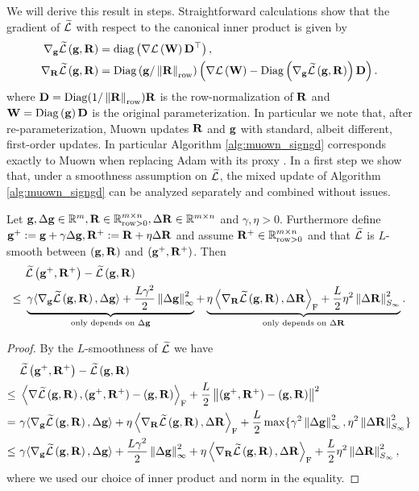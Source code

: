 {We will derive this result in steps. Straightforward calculations show that the gradient of $\Ft$ with respect to the canonical inner product is given by
\begin{align*}
    \nabla_\g \Ft\pare{\g, \Rbf} &= \mathrm{diag}\pare{\nabla \mathcal L\pare{\W} \D^\top},\\
    \nabla_\Rbf \Ft\pare{\g, \Rbf} &= \Diag\pare{\g/\RowNorm{\Rbf}}\pare{\nabla \mathcal L\pare{\W} - \Diag\pare{\nabla_\g \Ft\pare{\g,\Rbf}} \D}.
\end{align*}
where $\D = \Diag(1/\RowNorm{\Rbf})\Rbf$ is the row-normalization of $\Rbf$ and $\W = \Diag\pare{\g} \D$ is the original parameterization. In particular we note that, after re-parameterization, Muown updates $\Rbf$ and $\g$ with standard, albeit different, first-order updates. In particular Algorithm \ref{alg:muown_signgd} corresponds exactly to Muown when replacing Adam with its proxy \signsgd. In a first step we show that, under a smoothness assumption on $\Ft$, the mixed update of Algorithm \ref{alg:muown_signgd} can be analyzed separately and combined without issues.

\begin{lemma}\label{lem:split_algs}
    Let $\g, \Delta \g \in \mathbb{R}^m, \Rbf\in \rowPos, \Delta \Rbf \in \mathbb{R}^{m \times n}$ and $\gamma, \eta > 0$. Furthermore define $\g^+ := \g + \gamma \Delta \g, \Rbf^+ := \Rbf + \eta \Delta \Rbf$ and assume $\Rbf^+ \in \rowPos$ and that $\Ft$ is $L$-smooth between $(\g, \Rbf)$ and $(\g^+, \Rbf^+)$. Then
    \begin{align*}
        &\ \Ft\pare{\g^+, \Rbf^+} - \Ft\pare{\g, \Rbf} \\
        \leq &\  
        \underbrace{\gamma \langle \nabla_\g \Ft\pare{\g,\Rbf}, \Delta \g\rangle + \frac{L \gamma^2}{2}\norm{\Delta \g}_\infty^2}_{\text{only depends on $\Delta \g$}}
        + \underbrace{\eta \innerF{\nabla_\Rbf \Ft\pare{\g,\Rbf}}{\Delta \Rbf} + \frac{L}{2} \eta^2\opnorm{\Delta \Rbf}^2}_{\text{only depends on $\Delta \Rbf$}}.
    \end{align*}
\end{lemma}
\begin{proof}
    By the $L$-smoothness of $\Ft$ we have
    \begin{align*}
        &\ \Ft\pare{\g^+, \Rbf^+} - \Ft\pare{\g, \Rbf} \\
        \leq &\ \innerF{\nabla \Ft\pare{\g, \Rbf}}{(\g^+, \Rbf^+) - (\g, \Rbf)} + \frac{L}{2}\norm{(\g^+, \Rbf^+) - (\g, \Rbf)}^2 \\
        = &\ \gamma \langle \nabla_\g \Ft\pare{\g,\Rbf}, \Delta \g\rangle + \eta \innerF{\nabla_\Rbf \Ft\pare{\g,\Rbf}}{\Delta \Rbf} + \frac{L}{2}\max\{\gamma^2\norm{\Delta \g}_\infty^2, \eta^2\opnorm{\Delta \Rbf}^2\} \\
        \leq &\  
        \gamma \langle \nabla_\g \Ft\pare{\g,\Rbf}, \Delta \g\rangle + \frac{L \gamma^2}{2}\norm{\Delta \g}_\infty^2
        + \eta \innerF{\nabla_\Rbf \Ft\pare{\g,\Rbf}}{\Delta \Rbf} + \frac{L}{2} \eta^2\opnorm{\Delta \Rbf}^2,
    \end{align*}
    where we used our choice of inner product and norm in the equality.
\end{proof}

}
